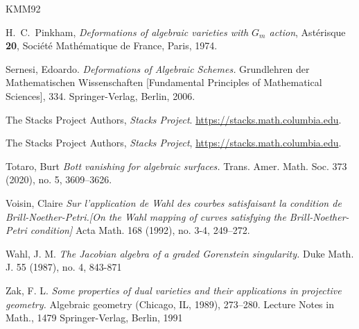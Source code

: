 \documentclass[11pt,twoside]{amsart}
\theoremstyle{plain}
\numberwithin{equation}{section}
\theoremstyle{definition}
\begin{document}
\begin{thebibliography}{KMM92}
  \color{black}
  


  \color{black}





H.~C.~Pinkham,
\newblock \emph{Deformations of algebraic varieties with \(G_m\) action},
\newblock Ast\'erisque \textbf{20}, Soci\'et\'e Math\'ematique de France, Paris, 1974.


Sernesi, Edoardo.
\emph{Deformations of Algebraic Schemes.}
Grundlehren der Mathematischen Wissenschaften [Fundamental Principles of Mathematical Sciences], 334. Springer-Verlag, Berlin, 2006.

The Stacks Project Authors,
\emph{Stacks Project}.
\url{https://stacks.math.columbia.edu}.

The Stacks Project Authors,
\emph{Stacks Project},
\url{https://stacks.math.columbia.edu}.

Totaro, Burt
\emph{Bott vanishing for algebraic surfaces.}
Trans. Amer. Math. Soc. 373 (2020), no. 5, 3609–3626.




Voisin, Claire
\emph{Sur l'application de Wahl des courbes satisfaisant la condition de Brill-Noether-Petri.[On the Wahl mapping of curves satisfying the Brill-Noether-Petri condition]}
Acta Math. 168 (1992), no. 3-4, 249–272.






Wahl, J. M. 
\emph{The Jacobian algebra of a graded Gorenstein singularity.}
Duke Math. J. 55 (1987), no. 4,
843-871

Zak, F. L.
\emph{Some properties of dual varieties and their applications in projective geometry.}
Algebraic geometry (Chicago, IL, 1989), 273–280.
Lecture Notes in Math., 1479
Springer-Verlag, Berlin, 1991


\end{thebibliography}
\end{document}

